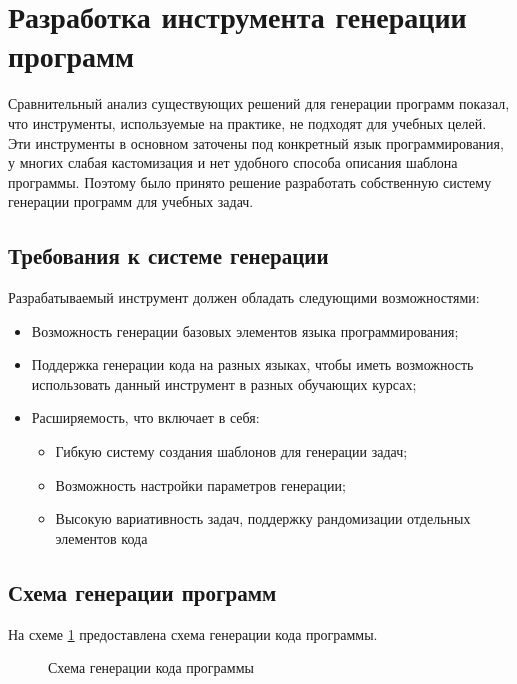 \section{Разработка инструмента генерации программ}
Сравнительный анализ существующих решений для генерации программ показал, что
инструменты, используемые на практике, не подходят для учебных целей. Эти инструменты
в основном заточены под конкретный язык программирования, у многих слабая кастомизация
и нет удобного способа описания шаблона программы. Поэтому было принято решение
разработать собственную систему генерации программ для учебных задач.

\subsection{Требования к системе генерации}
Разрабатываемый инструмент должен обладать следующими возможностями:
\begin{itemize}
    \item Возможность генерации базовых элементов языка программирования;
    \item Поддержка генерации кода на разных языках, чтобы иметь возможность использовать данный
          инструмент в разных обучающих курсах;
    \item Расширяемость, что включает в себя:
          \begin{itemize}
              \item Гибкую систему создания шаблонов для генерации задач;
              \item Возможность настройки параметров генерации;
              \item Высокую вариативность задач, поддержку рандомизации отдельных элементов кода
          \end{itemize}
\end{itemize}

\subsection{Схема генерации программ}
На схеме \ref{generation-steps} предоставлена схема генерации кода программы.
\begin{figure}[ht]
    \begin{center}
        \scalebox{0.8}{
            
        }
        \caption{\label{generation-steps} Схема генерации кода программы}
    \end{center}
\end{figure}
\clearpage

